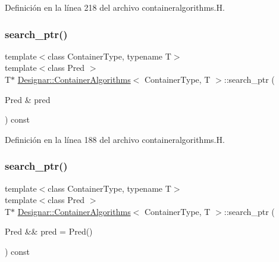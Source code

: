 Definición en la línea 218 del archivo containeralgorithms.\+H.

\mbox{\label{class_designar_1_1_container_algorithms_aa68717192cead08642f941dd4d9f06a1}} 
\subsubsection{\texorpdfstring{search\+\_\+ptr()}{search\_ptr()}\hspace{0.1cm}{\footnotesize\ttfamily [1/2]}}
{\footnotesize\ttfamily template$<$class Container\+Type, typename T$>$ \\
template$<$class Pred $>$ \\
T$\ast$ \hyperlink{class_designar_1_1_container_algorithms}{Designar\+::\+Container\+Algorithms}$<$ Container\+Type, T $>$\+::search\+\_\+ptr (\begin{DoxyParamCaption}\item[{Pred \&}]{pred }\end{DoxyParamCaption}) const\hspace{0.3cm}{\ttfamily [inline]}}



Definición en la línea 188 del archivo containeralgorithms.\+H.

\mbox{\label{class_designar_1_1_container_algorithms_a4d399ce473d6cddf3e133044403f492d}} 
\subsubsection{\texorpdfstring{search\+\_\+ptr()}{search\_ptr()}\hspace{0.1cm}{\footnotesize\ttfamily [2/2]}}
{\footnotesize\ttfamily template$<$class Container\+Type, typename T$>$ \\
template$<$class Pred $>$ \\
T$\ast$ \hyperlink{class_designar_1_1_container_algorithms}{Designar\+::\+Container\+Algorithms}$<$ Container\+Type, T $>$\+::search\+\_\+ptr (\begin{DoxyParamCaption}\item[{Pred \&\&}]{pred = {\ttfamily Pred()} }\end{DoxyParamCaption}) const\hspace{0.3cm}{\ttfamily [inline]}}



